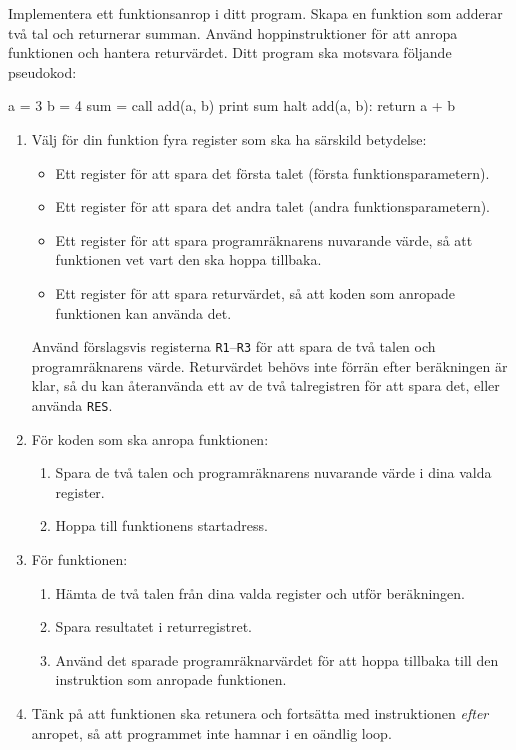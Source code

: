 \begin{Extrauppgifter}
    \item Implementera ett funktionsanrop i ditt program. Skapa en funktion som adderar två tal och returnerar summan. Använd hoppinstruktioner för att anropa funktionen och hantera returvärdet. Ditt program ska motsvara följande pseudokod:
    \begin{Code}
		a = 3
		b = 4
		sum = call add(a, b)
		print sum
		halt
		add(a, b):
		    return a + b
	\end{Code}
    \vspace{-3mm}
    \begin{enumerate}
        \item Välj för din funktion fyra register som ska ha särskild betydelse:
              \begin{itemize}
                  \item Ett register för att spara det första talet (första funktionsparametern).
                  \item Ett register för att spara det andra talet (andra funktionsparametern).
                  \item Ett register för att spara programräknarens nuvarande värde, så att funktionen vet vart den ska hoppa tillbaka.
                  \item Ett register för att spara returvärdet, så att koden som anropade funktionen kan använda det.
              \end{itemize}

              Använd förslagsvis registerna \texttt{R1}--\texttt{R3} för att spara de två talen och programräknarens värde. Returvärdet behövs inte förrän efter beräkningen är klar, så du kan återanvända ett av de två talregistren för att spara det, eller använda \texttt{RES}.
        \item För koden som ska anropa funktionen:
              \begin{enumerate}
                  \item Spara de två talen och programräknarens nuvarande värde i dina valda register.
                  \item Hoppa till funktionens startadress.
              \end{enumerate}
        \item För funktionen:
              \begin{enumerate}
                  \item Hämta de två talen från dina valda register och utför beräkningen.
                  \item Spara resultatet i returregistret.
                  \item Använd det sparade programräknarvärdet för att hoppa tillbaka till den instruktion som anropade funktionen.
              \end{enumerate}
        \item Tänk på att funktionen ska retunera och fortsätta med instruktionen \emph{efter} anropet, så att programmet inte hamnar i en oändlig loop.


\end{enumerate}
\end{Extrauppgifter}

